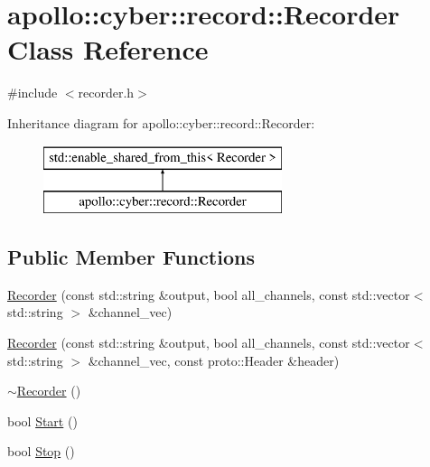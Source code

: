 \hypertarget{classapollo_1_1cyber_1_1record_1_1Recorder}{\section{apollo\-:\-:cyber\-:\-:record\-:\-:Recorder Class Reference}
\label{classapollo_1_1cyber_1_1record_1_1Recorder}
}


{\ttfamily \#include $<$recorder.\-h$>$}

Inheritance diagram for apollo\-:\-:cyber\-:\-:record\-:\-:Recorder\-:\begin{figure}[H]
\begin{center}
\leavevmode
\includegraphics[height=2.000000cm]{classapollo_1_1cyber_1_1record_1_1Recorder}
\end{center}
\end{figure}
\subsection*{Public Member Functions}
\begin{DoxyCompactItemize}
\item 
\hyperlink{classapollo_1_1cyber_1_1record_1_1Recorder_a7e6059eed97d720778acb9b7b090c130}{Recorder} (const std\-::string \&output, bool all\-\_\-channels, const std\-::vector$<$ std\-::string $>$ \&channel\-\_\-vec)
\item 
\hyperlink{classapollo_1_1cyber_1_1record_1_1Recorder_a0ce864fc3deadf13f292533c27335330}{Recorder} (const std\-::string \&output, bool all\-\_\-channels, const std\-::vector$<$ std\-::string $>$ \&channel\-\_\-vec, const proto\-::\-Header \&header)
\item 
\hyperlink{classapollo_1_1cyber_1_1record_1_1Recorder_a932ad6db8cbf58b15c6ed44ae80b5e9c}{$\sim$\-Recorder} ()
\item 
bool \hyperlink{classapollo_1_1cyber_1_1record_1_1Recorder_aa3a2084056a4b05c496782c6855a57fe}{Start} ()
\item 
bool \hyperlink{classapollo_1_1cyber_1_1record_1_1Recorder_a0bd7c077dec0fd2c2dd993168c0a36f3}{Stop} ()
\end{DoxyCompactItemize}
